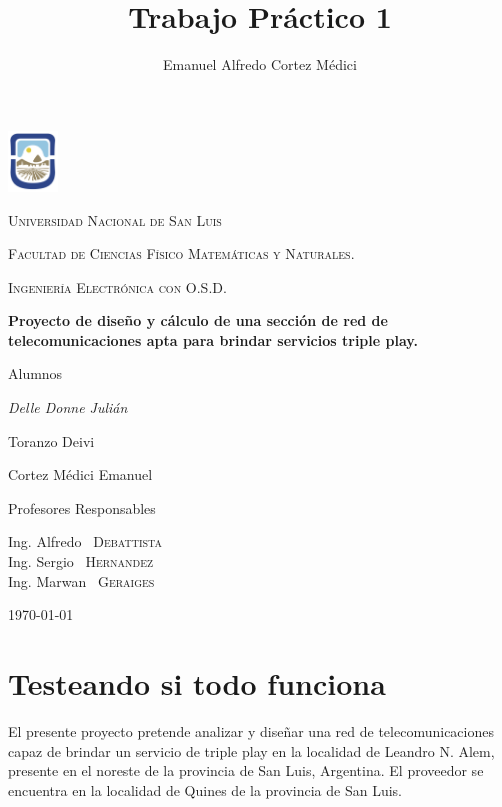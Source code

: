 \documentclass[11pt,a4paper]{article}
\author{Emanuel Alfredo Cortez Médici}
\title{Trabajo Práctico 1}
\begin{document}
	\begin{titlepage}
	\centering
	
	\includegraphics[width=0.1\textwidth]{fotos_ema/unsl.png} 
	
	{\scshape\LARGE Universidad Nacional de San Luis\par}
	{\scshape Facultad de Ciencias Físico Matemáticas y Naturales.\par}
	{\scshape Ingeniería Electrónica con O.S.D.\par}
	\vspace{1.5cm}
	{\scshape\Large  \par}
	\vspace{1.5cm}
	{\huge\bfseries  Proyecto de diseño y cálculo de una sección de red de telecomunicaciones apta para brindar servicios triple play. \par}

	\vspace{2cm}
	Alumnos\par
	{\Large\itshape Delle Donne Julián \par 
	Toranzo Deivi \par 
	Cortez Médici Emanuel\par}
	\vfill
	Profesores Responsables\par
	Ing. Alfredo ~\textsc{Debattista}\\
	Ing. Sergio ~\textsc{Hernandez} \\
	Ing. Marwan ~\textsc{Geraiges}
	
	\vfill

	{\large \today\par}
\end{titlepage}

\newpage

\tableofcontents

\clearpage
\part{Testeando si todo funciona}

El presente proyecto pretende analizar y diseñar una red de telecomunicaciones capaz de brindar un servicio de triple play en la localidad de  Leandro N. Alem, presente en el noreste de la provincia de San Luis, Argentina. El proveedor se encuentra en la localidad de Quines de la provincia de San Luis.
\end{document}

